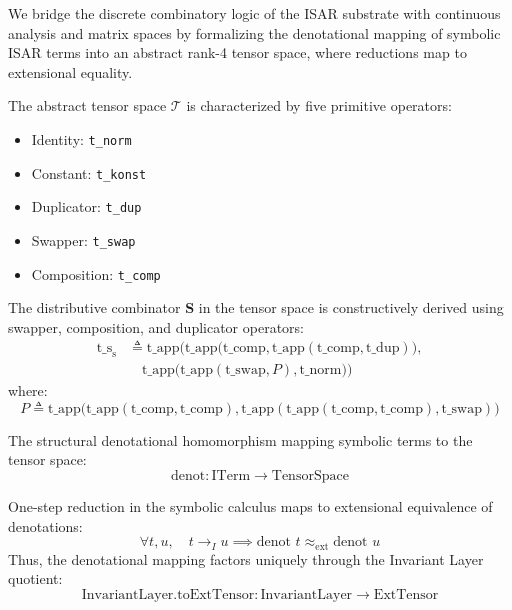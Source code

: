 We bridge the discrete combinatory logic of the ISAR substrate with continuous analysis and matrix spaces by formalizing the denotational mapping of symbolic ISAR terms into an abstract rank-4 tensor space, where reductions map to extensional equality.

\begin{definition}
The abstract tensor space $\mathcal{T}$ is characterized by five primitive operators:
\begin{itemize}
    \item Identity: \texttt{t\_norm}
    \item Constant: \texttt{t\_konst}
    \item Duplicator: \texttt{t\_dup}
    \item Swapper: \texttt{t\_swap}
    \item Composition: \texttt{t\_comp}
\end{itemize}
\end{definition}

\begin{definition}
The distributive combinator $\mathbf{S}$ in the tensor space is constructively derived using swapper, composition, and duplicator operators:
\begin{align*}
\text{t\_s}_{\text{s}} &\triangleq \text{t\_app}\Big(\text{t\_app}\big(\text{t\_comp}, \text{t\_app}(\text{t\_comp}, \text{t\_dup})\big), \\
&\quad \text{t\_app}\big(\text{t\_app}(\text{t\_swap}, P), \text{t\_norm}\big)\Big)
\end{align*}
where:
\[ P \triangleq \text{t\_app}\big(\text{t\_app}(\text{t\_comp}, \text{t\_comp}), \text{t\_app}(\text{t\_app}(\text{t\_comp}, \text{t\_comp}), \text{t\_swap})\big) \]
\end{definition}

\begin{definition}
The structural denotational homomorphism mapping symbolic terms to the tensor space:
$$\text{denot} : \text{ITerm} \to \text{TensorSpace}$$
\end{definition}

\begin{theorem}
One-step reduction in the symbolic calculus maps to extensional equivalence of denotations:
$$\forall t, u, \quad t \to_I u \implies \text{denot } t \approx_{\text{ext}} \text{denot } u$$
Thus, the denotational mapping factors uniquely through the Invariant Layer quotient:
$$\text{InvariantLayer.toExtTensor} : \text{InvariantLayer} \to \text{ExtTensor}$$
\end{theorem}

